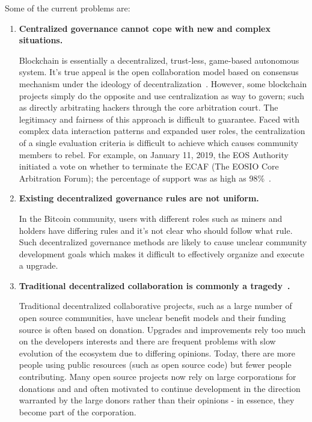 Some of the current problems are:

\begin{enumerate}
	\item

	\textbf{Centralized governance cannot cope with new and complex situations.}

	Blockchain is essentially a decentralized, trust-less, game-based autonomous system. It's true appeal is the open collaboration model based on consensus mechanism under the ideology of decentralization~\cite{whitepaper}. However, some blockchain projects simply do the opposite and use centralization as way to govern; such as directly arbitrating hackers through the core arbitration court. The legitimacy and fairness of this approach is difficult to guarantee. Faced with complex data interaction patterns and expanded user roles, the centralization of a single evaluation criteria is difficult to achieve which causes community members to rebel. For example, on January 11, 2019, the EOS Authority initiated a vote on whether to terminate the ECAF (The EOSIO Core Arbitration Forum); the percentage of support was as high as 98\%~\cite{DeleteECAF}.

	\item

	\textbf{Existing decentralized governance rules are not uniform.}

	In the Bitcoin community, users with different roles such as miners and holders have differing rules and it's not clear who should follow what rule. Such decentralized governance methods are likely to cause unclear community development goals which makes it difficult to effectively organize and execute a upgrade.

	\item

	\textbf{Traditional decentralized collaboration is commonly a tragedy~\cite{TragedyOfTheCommons}.}

	Traditional decentralized collaborative projects, such as a large number of open source communities, have unclear benefit models and their funding source is often based on donation. Upgrades and improvements rely too much on the developers interests and there are frequent problems with slow evolution of the ecosystem due to differing opinions. Today, there are more people using public resources (such as open source code) but fewer people contributing. Many open source projects now rely on large corporations for donations and and often motivated to continue development in the direction warranted by the large donors rather than their opinions - in essence, they become part of the corporation.


\end{enumerate}

